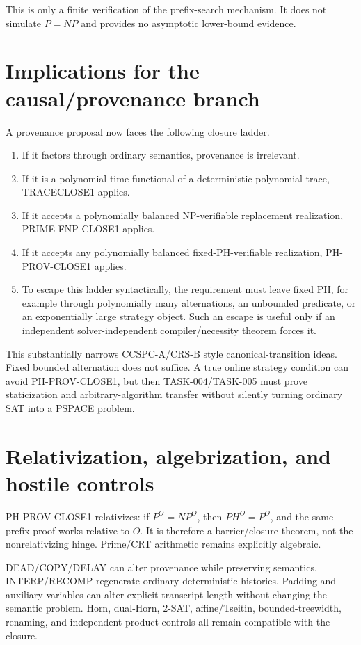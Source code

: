 \documentclass[11pt]{article}
\begin{document}
This is only a finite verification of the prefix-search mechanism. It does not simulate \(P=NP\)
and provides no asymptotic lower-bound evidence.

\section*{Implications for the causal/provenance branch}
A provenance proposal now faces the following closure ladder.

\begin{enumerate}
\item If it factors through ordinary semantics, provenance is irrelevant.
\item If it is a polynomial-time functional of a deterministic polynomial trace, TRACECLOSE1 applies.
\item If it accepts a polynomially balanced NP-verifiable replacement realization, PRIME-FNP-CLOSE1 applies.
\item If it accepts any polynomially balanced fixed-PH-verifiable realization, PH-PROV-CLOSE1 applies.
\item To escape this ladder syntactically, the requirement must leave fixed PH, for example through
polynomially many alternations, an unbounded predicate, or an exponentially large strategy object.
Such an escape is useful only if an independent solver-independent compiler/necessity theorem forces it.
\end{enumerate}

This substantially narrows CCSPC-A/CRS-B style canonical-transition ideas. Fixed bounded
alternation does not suffice. A true online strategy condition can avoid PH-PROV-CLOSE1, but then
TASK-004/TASK-005 must prove staticization and arbitrary-algorithm transfer without silently turning
ordinary SAT into a PSPACE problem.

\section*{Relativization, algebrization, and hostile controls}
PH-PROV-CLOSE1 relativizes: if \(P^O=NP^O\), then \(PH^O=P^O\), and the same prefix proof works
relative to \(O\). It is therefore a barrier/closure theorem, not the nonrelativizing hinge.
Prime/CRT arithmetic remains explicitly algebraic.

DEAD/COPY/DELAY can alter provenance while preserving semantics. INTERP/RECOMP regenerate
ordinary deterministic histories. Padding and auxiliary variables can alter explicit transcript
length without changing the semantic problem. Horn, dual-Horn, 2-SAT, affine/Tseitin,
bounded-treewidth, renaming, and independent-product controls all remain compatible with the closure.
\end{document}
